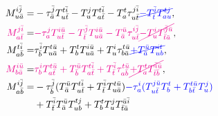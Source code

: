 \documentclass[a4paper,12pt,oneside]{book}
\newcommand{\blue}[1]{{\color{blue} #1}}
\newcommand{\magenta}[1]{{\color{magenta} #1}}
\newcommand{\spa}[1]{{#1}}
\newcommand{\spb}[1]{\bar{#1}}
\begin{document}
\begin{align}
M^{\spa{i}\spb{j}}_{\spa{u}\spb{a}} = &-\tau^{\spb{j}}_{\spb{a}} T^{\spa{t}\spb{i}}_{\spa{u}\spb{t}} 
                                       -T^{\spa{j}}_{\spa{u}} T^{\spa{t}\spb{i}}_{\spa{a}\spb{t}}
                                       -T^{\spa{t}}_{\spa{a}} \tau^{\spa{j}\spb{i}}_{\spa{u}\spb{t}} 
                         \blue{\cancel{-T^{\spb{i}}_{\spb{t}} T^{\spa{t}\spa{j}}_{\spa{a}\spa{u}}}},\\
\magenta{M^{\spa{j}\spb{i}}_{\spa{a}\spb{t}}} = &\magenta{-\tau^{\spa{j}}_{\spa{a}} T^{\spa{i}\spb{u}}_{\spa{u}\spb{t}} 
                                                -T^{\spb{j}}_{\spb{t}} T^{\spa{i}\spb{u}}_{\spa{u}\spb{a}}
                                                -T^{\spb{u}}_{\spb{a}} \tau^{\spa{i}\spb{j}}_{\spa{u}\spb{t}}
                                        \cancel{-T^{\spa{i}}_{\spa{u}} T^{\spb{j}\spb{u}}_{\spb{t}\spb{a}}}}, \\
M^{\spa{t}\spb{i}}_{\spa{a}\spb{b}} = &\tau^{\spb{i}}_{\spb{b}} T^{\spa{t}\spb{u}}_{\spa{u}\spb{a}} 
                                      +T^{\spa{t}}_{\spa{b}} T^{\spa{i}\spb{u}}_{\spa{u}\spb{a}}
                                      +T^{\spa{i}}_{\spa{u}} \tau^{\spa{t}\spb{u}}_{\spa{b}\spb{a}}
                        \blue{\cancel{+T^{\spb{u}}_{\spb{a}} T^{\spa{i}\spa{t}}_{\spa{u}\spa{b}}}},\\
\magenta{M^{\spa{i}\spb{u}}_{\spa{b}\spb{a}}} = &\magenta{\tau^{\spa{i}}_{\spa{b}} T^{\spa{t}\spb{u}}_{\spa{a}\spb{t}}
                                                +T^{\spb{u}}_{\spb{b}} T^{\spa{t}\spb{i}}_{\spa{a}\spb{t}}
                                                +T^{\spb{i}}_{\spb{t}} \tau^{\spa{t}\spb{u}}_{\spa{a}\spb{b}}
                                        \cancel{+T^{\spa{t}}_{\spa{a}} T^{\spb{i}\spb{u}}_{\spb{t}\spb{b}}}},\\
M^{\spa{i}\spb{j}}_{\spa{a}\spb{b}} = &-\tau^{\spb{j}}_{\spb{b}} (T^{\spb{u}}_{\spb{a}} T^{\spa{t}\spb{i}}_{\spa{u}\spb{t}}
                                      +T^{\spb{i}}_{\spb{t}} T^{\spa{t}\spb{u}}_{\spa{u}\spb{a}})
                                \blue{-\tau^{\spa{i}}_{\spa{a}}(T^{\spa{j}\spb{u}}_{\spa{u}\spb{t}} T^{\spa{t}}_{\spa{b}}
                                      +T^{\spa{t}\spb{u}}_{\spa{b}\spb{t}} T^{\spa{j}}_{\spa{u}})} \nonumber \\
                                     &+T^{\spb{i}}_{\spb{t}} T^{\spb{u}}_{\spb{a}} T^{\spa{t}\spa{j}}_{\spa{u}\spa{b}} 
                                      +T^{\spa{t}}_{\spa{b}} T^{\spa{j}}_{\spa{u}} T^{\spb{u}\spb{i}}_{\spb{t}\spb{a}}

\end{align}
\end{document}

